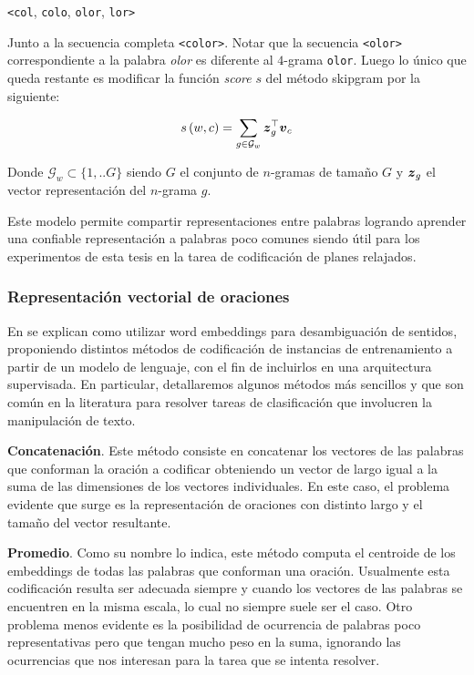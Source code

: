\begin{center}
    \verb|<col|, \verb|colo|, \verb|olor|, \verb|lor>|
\end{center}

Junto a la secuencia completa \verb|<color>|. Notar que la secuencia
\verb|<olor>| correspondiente a la palabra \emph{olor} es diferente al $4$-grama
\verb|olor|. Luego lo único que queda restante es modificar la función
\emph{score} $s$ del método skipgram por la siguiente:

\begin{align*}
    s\left(w, c\right) = \sum_{g \in \mathcal{G}_w} \boldsymbol{z}_g^{\top}\boldsymbol{v}_c
\end{align*}

Donde $\mathcal{G}_w \subset \{1, .. G\}$ siendo $G$ el conjunto de $n$-gramas
de tamaño $G$ y $\boldsymbol{z}_g$ el vector representación del $n$-grama $g$.

Este modelo permite compartir representaciones entre palabras logrando aprender
una confiable representación a palabras poco comunes siendo útil para los
experimentos de esta tesis en la tarea de codificación de planes relajados.

\subsubsection{Representación vectorial de oraciones}

En \citep{Iacobacci-2016} se explican como utilizar word embeddings para
desambiguación de sentidos, proponiendo distintos métodos de codificación de
instancias de entrenamiento a partir de un modelo de lenguaje, con el fin
de incluirlos en una arquitectura supervisada. En particular, detallaremos
algunos métodos más sencillos y que son común en la literatura para resolver
tareas de clasificación que involucren la manipulación de texto.

\textbf{Concatenación}. Este método consiste en concatenar los vectores de las
palabras que conforman la oración a codificar obteniendo un vector de largo
igual a la suma de las dimensiones de los vectores individuales. En este caso,
el problema evidente que surge es la representación de oraciones con distinto
largo y el tamaño del vector resultante.

\textbf{Promedio}. Como su nombre lo indica, este método computa el centroide de
los embeddings de todas las palabras que conforman una oración. Usualmente esta
codificación resulta ser adecuada siempre y cuando los vectores de las palabras
se encuentren en la misma escala, lo cual no siempre suele ser el caso. Otro
problema menos evidente es la posibilidad de ocurrencia de palabras poco
representativas pero que tengan mucho peso en la suma, ignorando las ocurrencias
que nos interesan para la tarea que se intenta resolver.

